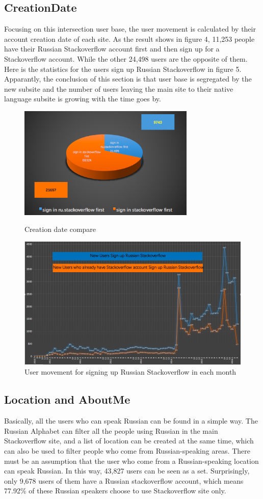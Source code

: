 \documentclass{article}
\begin{document}
\subsection{CreationDate}
Focusing on this intersection user base, the user movement is calculated by their account creation date of each site. As the result shows in figure 4, 11,253 people have their Russian Stackoverflow account first and then sign up for a Stackoverflow account. While the other 24,498 users are the opposite of them. Here is the statistics for the users sign up Russian Stackoverflow in figure 5. Apparantly, the conclusion of this section is that user base is segregated by the new subsite and the number of users leaving the main site to their native language subsite is growing with the time goes by.
	\begin{figure}[H]
		\includegraphics[width = 0.75\textwidth]{user2.png}
		\caption{Creation date compare}
		\includegraphics[width = 1.0\textwidth]{user1.png}
		\caption{User movement for signing up Russian Stackoverflow in each month}
  	\end{figure}

\subsection{Location and AboutMe}
Basically, all the users who can speak Russian can be found in a simple way. The Russian Alphabet can filter all the people using Russian in the main Stackoverflow site, and a list of location can be created at the same time, which can also be used to filter people who come from Russian-speaking areas. There must be an assumption that the user who come from a Russian-speaking location can speak Russian. In this way, 43,827 users can be seen as a set. Surprisingly, only 9,678 users of them have a Russian stackoverflow account, which means 77.92\% of these Russian speakers choose to use Stackoverflow site only.
\end{document}
